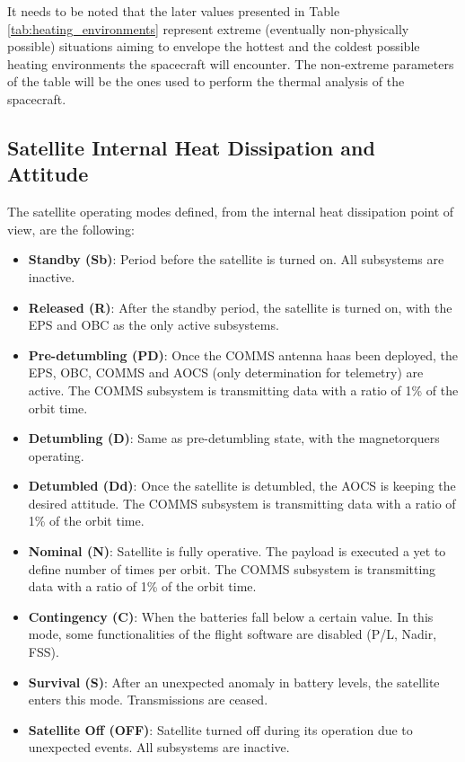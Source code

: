 It needs to be noted that the later values presented in Table \ref{tab:heating_environments} represent extreme (eventually non-physically possible) situations aiming to envelope the hottest and the coldest possible heating environments the spacecraft will encounter. The non-extreme parameters of the table will be the ones used to perform the thermal analysis of the spacecraft.


\subsection{Satellite Internal Heat Dissipation and Attitude}


The satellite operating modes defined, from the internal heat dissipation point of view, are the following:

\begin{itemize}
    \item \textbf{Standby (Sb)}: Period before the satellite is turned on. All subsystems are inactive.
    \item \textbf{Released (R)}: After the standby period, the satellite is turned on, with the EPS and OBC as the only active subsystems.
    \item \textbf{Pre-detumbling (PD)}: Once the COMMS antenna haas been deployed, the EPS, OBC, COMMS and AOCS (only determination for telemetry) are active. The COMMS subsystem is transmitting data with a ratio of 1\% of the orbit time.
    \item \textbf{Detumbling (D)}: Same as pre-detumbling state, with the magnetorquers operating.
    \item \textbf{Detumbled (Dd)}: Once the satellite is detumbled, the AOCS is keeping the desired attitude. The COMMS subsystem is transmitting data with a ratio of 1\% of the orbit time.
    \item \textbf{Nominal (N)}: Satellite is fully operative. The payload is executed a yet to define number of times per orbit. The COMMS subsystem is transmitting data with a ratio of 1\% of the orbit time.
    \item \textbf{Contingency (C)}: When the batteries fall below a certain value. In this mode, some functionalities of the flight software are disabled (P/L, Nadir, FSS).
    \item \textbf{Survival (S)}: After an unexpected anomaly in battery levels, the satellite enters this mode. Transmissions are ceased.
    \item \textbf{Satellite Off (OFF)}: Satellite turned off during its operation due to unexpected events. All subsystems are inactive.
\end{itemize}

